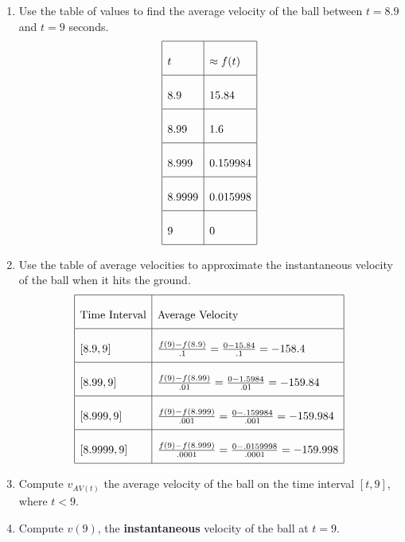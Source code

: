 \documentclass{ximera}
\begin{document}
\begin{problem}
\begin{enumerate}
		 \item Use the table of values to find the average velocity of the ball between $t=8.9$ and $t=9$ seconds.
	\[
\begin{array}{|l|l|}
			\hline
			t & \approx f(t)  \\
			\hline
			8.9 & 15.84  \\
			\hline
			8.99 & 1.6  \\
			\hline
			8.999 & 0.159984  \\
			\hline
			8.9999 &  0.015998  \\
			\hline
			9 &  0  \\
			\hline
			\end{array}
		\]
  \item  Use the table of average velocities to approximate the instantaneous velocity of the ball when it hits the ground.
			 \[
			\renewcommand*{\arraystretch}{2.5}	
			\begin{array}{|l|l|}
			\hline
			\text{Time Interval} & \text{Average Velocity}  \\
			\hline
			[8.9, 9] & \frac{f(9)-f(8.9)}{.1}=\frac{0-15.84}{.1}=-158.4  \\
			\hline
			[8.99,9] & \frac{f(9)-f(8.99)}{.01}=\frac{0-1.5984}{.01}=-159.84 \\
			\hline
			[8.999, 9] & \frac{f(9)-f(8.999)}{.001}=\frac{0-.159984}{.001}=-159.984 \\
			\hline
			[8.9999, 9] &  \frac{f(9)-f(8.999)}{.0001}=\frac{0-.0159998}{.0001}=-159.998  \\
			\hline
			\end{array} 
			\]

		\item   Compute $v_{AV(t)}$ the average velocity of the ball on the time interval  $[t, 9]$, where $t<9$.

		\item   Compute $v(9)$, the \textbf{instantaneous} velocity of the ball at $t=9$.

		\end{enumerate}	
\end{problem}
\end{document}
